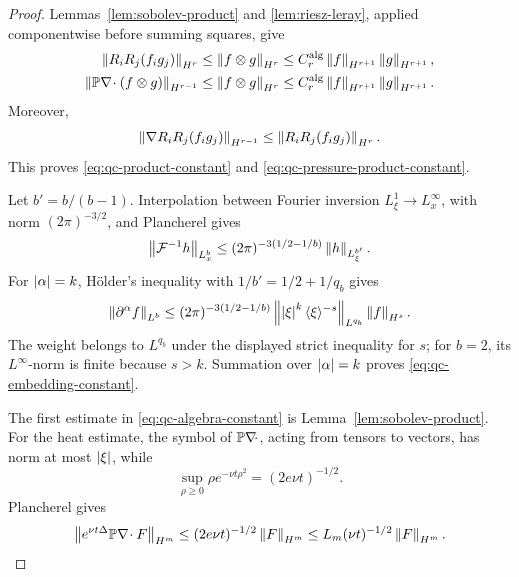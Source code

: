 \begin{proof}
Lemmas~\ref{lem:sobolev-product} and \ref{lem:riesz-leray}, applied
componentwise before summing squares, give
\begin{align*}
 \left\lVert R_iR_j(f_i g_j)\right\rVert_{H^r}
 &\le\left\lVert f\otimes g\right\rVert_{H^r}
 \le C_r^{\rm alg}\left\lVert f\right\rVert_{H^{r+1}}\left\lVert g\right\rVert_{H^{r+1}},\\
 \left\lVert \mathbb P\nabla\!\cdot(f\otimes g)\right\rVert_{H^{r-1}}
 &\le\left\lVert f\otimes g\right\rVert_{H^r}
 \le C_r^{\rm alg}\left\lVert f\right\rVert_{H^{r+1}}\left\lVert g\right\rVert_{H^{r+1}}.
\end{align*}
Moreover,
\[
 \left\lVert \nabla R_iR_j(f_i g_j)\right\rVert_{H^{r-1}}
 \le\left\lVert R_iR_j(f_i g_j)\right\rVert_{H^r}.
\]
This proves \eqref{eq:qc-product-constant} and
\eqref{eq:qc-pressure-product-constant}.

Let \(b'=b/(b-1)\).  Interpolation between Fourier inversion
\(L^1_\xi\to L^\infty_x\), with norm \((2\pi)^{-3/2}\), and Plancherel
gives
\[
 \left\lVert \mathcal F^{-1}h\right\rVert_{L^b_x}
 \le(2\pi)^{-3(1/2-1/b)}\left\lVert h\right\rVert_{L^{b'}_\xi}.
\]
For \(\left|\alpha\right|=k\), H\"older's inequality with
\(1/b'=1/2+1/q_b\) gives
\[
 \left\lVert \partial^\alpha f\right\rVert_{L^b}
 \le(2\pi)^{-3(1/2-1/b)}
 \left\lVert \left|\xi\right|^k\langle\xi\rangle^{-s}\right\rVert_{L^{q_b}}
 \left\lVert f\right\rVert_{H^s}.
\]
The weight belongs to \(L^{q_b}\) under the displayed strict inequality
for \(s\); for \(b=2\), its \(L^\infty\)-norm is finite because \(s>k\).
Summation over \(\left|\alpha\right|=k\) proves
\eqref{eq:qc-embedding-constant}.

The first estimate in \eqref{eq:qc-algebra-constant} is
Lemma~\ref{lem:sobolev-product}.  For the heat estimate, the symbol of
\(\mathbb P\nabla\!\cdot\), acting from tensors to vectors, has norm at most
\(\left|\xi\right|\), while
\[
 \sup_{\rho\ge0}\rho e^{-\nu t\rho^2}=(2e\nu t)^{-1/2}.
\]
Plancherel gives
\[
 \left\lVert e^{\nu t\Delta}\mathbb P\nabla\!\cdot F\right\rVert_{H^m}
 \le(2e\nu t)^{-1/2}\left\lVert F\right\rVert_{H^m}
 \le L_m(\nu t)^{-1/2}\left\lVert F\right\rVert_{H^m}.
\]
\end{proof}


